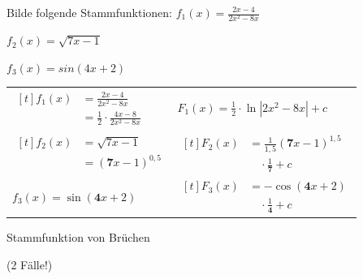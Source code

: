 \documentclass[paper=a6,landscape,ngerman,twoside=true,fontsize=12pt]{scrartcl}
\begin{document}
\begin{frage}
	Bilde folgende Stammfunktionen: 
	\flushleft 
	$f_1(x)=\frac{2x-4}{2x^2-8x}$
	
	\bigskip
	$f_2(x)=\sqrt{7x-1}$
	
	\bigskip
	$f_3(x)=sin(4x+2)$	
\end{frage}
\begin{antwort}
\begin{center}
	\begin{tabularx}{\textwidth}{>{\raggedright\arraybackslash}X | >{\raggedright\arraybackslash}X}
		\multicolumn{1}{c|}{$f(x)$} & \multicolumn{1}{c}{$F(x)$} \\
		\hline
		$\begin{aligned}[t]
		f_1(x)&=\frac{2x-4}{2x^2-8x} \\
		&=\frac{1}{2}\cdot\frac{4x-8}{2x^2-8x}
		\end{aligned}$ & $F_1(x)=\frac{1}{2}\cdot \ln|2x^2-8x|+c$ \\[4ex]
		
		$\begin{aligned}[t]
			f_2(x) &= \sqrt{7x-1} \\
			&= (\mathbf{7}x-1)^{0,5}
		\end{aligned}$ & $\begin{aligned}[t] F_2(x)&=\frac{1}{1,5}(\mathbf{7}x-1)^{1,5}\\
		&\quad\cdot\frac{1}{\mathbf{7}}+c \end{aligned}$ \\[4ex]
		
		$f_3(x)=\sin(\mathbf{4}x+2)$ & $\begin{aligned}[t]F_3(x)&=-\cos(\mathbf{4}x+2)\\&\quad\cdot\frac{1}{\mathbf{4}}+c\end{aligned}$ \\
	\end{tabularx}
\end{center}
\end{antwort}
\begin{frage}
	Stammfunktion von Brüchen
	
	(2 Fälle!)
\end{frage}
\end{document}
